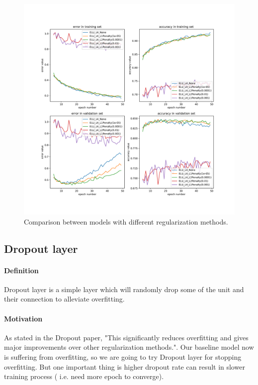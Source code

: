 \documentclass{article}
\begin{document}
\begin{figure}[tb]
\begin{center}
\centerline{\includegraphics[width=\columnwidth]{fig/reg.pdf}}
\caption{Comparison between models with different regularization methods.}
\label{fig:base_reg}
\end{center}
\end{figure} 


\subsection{Dropout layer}
\paragraph{Definition} Dropout layer \citep{JMLR:v15:srivastava14a} is a simple layer which will randomly drop some of the unit and their connection to alleviate  overfitting.
\paragraph{Motivation}
As stated in the Dropout paper, "This significantly
reduces overfitting and gives major improvements over other regularization methods."\citep{JMLR:v15:srivastava14a}. Our baseline model now is suffering from overfitting, so we are going to try Dropout layer for stopping overfitting. But one important thing is higher dropout rate can result in slower training process ( i.e.  need more epoch to converge). 
\end{document}

